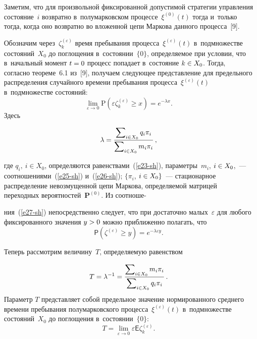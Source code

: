\begin{multicols}{2}
Заметим, что для произвольной фиксированной до\-пус\-ти\-мой стратегии управ\-ле\-ния 
со\-сто\-яние~$i$ возвратно в~полумарковском процессе~$\xi^{(0)} (t)$ тогда и~только 
тогда, когда оно возвратно во вложенной цепи Маркова данного процесса~[9].

Обозначим через~$\zeta_{k}^{(\varepsilon )}$ время пребывания процесса~$\xi^{(\varepsilon )} (t)$ 
в~подмножестве состояний~$X_{0}$ до  поглощения  в~со\-сто\-янии~$\{0\}$, 
определяемое при условии, что в~начальный момент $t\hm=0$ 
процесс попадает в~состояние $k \hm\in X_{0}$. Тогда, согласно тео\-ре\-ме~6.1 из~[9], 
получаем следующее представление для предельного распределения случайного 
времени пребывания процесса~$\xi^{(\varepsilon)} (t)$ в~подмножестве состояний:
\begin{equation}
\lim\limits_{\varepsilon \to 0} \mathrm{P}\left(\varepsilon \zeta_{k}^{(\varepsilon )} 
\geq x\right)=e^{-\lambda x}.
\label{e27-sh}
\end{equation}
Здесь

\vspace*{-2pt}

\noindent
$$
\lambda=\displaystyle\frac{\displaystyle \sum\nolimits_{i\in X_{0} }q_{i} \pi_{i}\mathstrut}{\displaystyle \sum\nolimits_{i\in 
X_{0} }m_{i}\pi_{i}\mathstrut}\,,
$$ 

\vspace*{-2pt}

\noindent
где $q_{i},~i\in X_0$, определяются равенствами~(\ref{e23-sh}), 
параметры~$m_i$, $i \hm\in X_0$,~--- соотношениями~(\ref{e25-sh}) и~(\ref{e26-sh}); 
$\{\pi_i$, $i\hm\in X_0\}$~--- стационарное распределение невозмущенной цепи Маркова, определяемой матрицей 
переходных вероятностей~$\mathbf{P}^{(0)}$. Из соотноше-\linebreak\vspace*{-12pt}

\columnbreak

\noindent
ния~(\ref{e27-sh}) непосредственно 
следует, что при достаточно малых~$\varepsilon$ для любого фиксированного 
значения $y\hm>0$ можно приближенно полагать, что 
\begin{equation}
\mathsf{P}\left(\zeta^{(\varepsilon  )}\geq y\right) = e^{-\lambda \varepsilon y}.\label{e28-sh}
\end{equation}

Теперь рассмотрим величину~$T$, определяемую равенством

\noindent
\begin{equation}
T=\lambda^{-1} =\displaystyle\frac{\displaystyle \sum\nolimits_{i\in X_{0} }m_{i} 
\pi_{i}\mathstrut}{\displaystyle \sum\nolimits_{i\in X_{0} }q_{i} \pi_{i}\mathstrut}\,. \label{e29-sh}
\end{equation}
Параметр $T$ представляет собой предельное значение нормированного 
среднего времени пребывания полумарковского процесса~$\xi^{(\varepsilon)} (t)$ в~подмножестве состояний~$X_{0}$ до поглощения в~состоянии~$\{0\}$:
$$ 
T=\lim\limits_{\varepsilon \to 0} \varepsilon \mathsf{E}\zeta_{k}^{(\varepsilon )}.
$$


\end{multicols}
